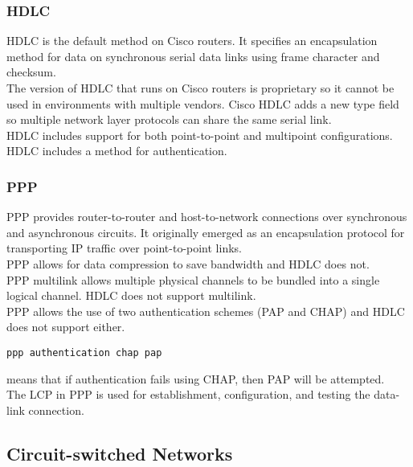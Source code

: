 \subsubsection{HDLC}

HDLC is the default method on Cisco routers. It specifies an encapsulation
method for data on synchronous serial data links using frame character and
checksum.\\

The version of HDLC that runs on Cisco routers is proprietary so it cannot
be used in environments with multiple vendors. Cisco HDLC adds a new type field
so multiple network layer protocols can share the same serial link.\\

HDLC includes support for both point-to-point and multipoint configurations.\\

HDLC includes a method for authentication.

\subsubsection{PPP}

PPP provides router-to-router and host-to-network connections over synchronous
and asynchronous circuits. It originally emerged as an encapsulation protocol
for transporting IP traffic over point-to-point links.\\

PPP allows for data compression to save bandwidth and HDLC does not.\\

PPP multilink allows multiple physical channels to be bundled into a single
logical channel. HDLC does not support multilink.\\

PPP allows the use of two authentication schemes (PAP and CHAP) and HDLC
does not support either.

\begin{verbatim}
ppp authentication chap pap
\end{verbatim}

means that if authentication fails using CHAP, then PAP will be attempted.\\

The LCP in PPP is used for establishment, configuration, and testing the
data-link connection.

\subsection{Circuit-switched Networks}

